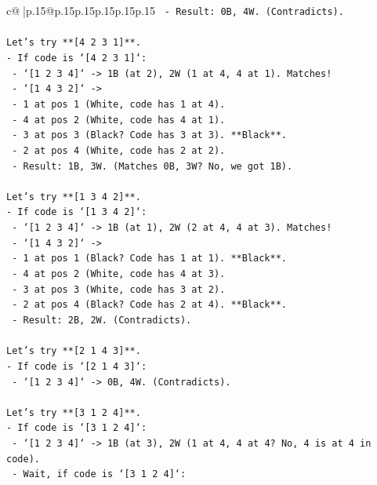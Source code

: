 \documentclass{article}
\begin{document}
{\begin{supertabular}{c@{$\;$}|p{.15\linewidth}@{}p{.15\linewidth}p{.15\linewidth}p{.15\linewidth}p{.15\linewidth}p{.15\linewidth}}
{{{\texttt{    {-} Result: 0B, 4W. (Contradicts).} \\
\\ 
\texttt{Let's try **{[}4 2 3 1{]}**.} \\
\texttt{{-} If code is `{[}4 2 3 1{]}`:} \\
\texttt{  {-} `{[}1 2 3 4{]}` {-}> 1B (at 2), 2W (1 at 4, 4 at 1). Matches!} \\
\texttt{  {-} `{[}1 4 3 2{]}` {-}>} \\
\texttt{    {-} 1 at pos 1 (White, code has 1 at 4).} \\
\texttt{    {-} 4 at pos 2 (White, code has 4 at 1).} \\
\texttt{    {-} 3 at pos 3 (Black? Code has 3 at 3). **Black**.} \\
\texttt{    {-} 2 at pos 4 (White, code has 2 at 2).} \\
\texttt{    {-} Result: 1B, 3W. (Matches 0B, 3W? No, we got 1B).} \\
\\ 
\texttt{Let's try **{[}1 3 4 2{]}**.} \\
\texttt{{-} If code is `{[}1 3 4 2{]}`:} \\
\texttt{  {-} `{[}1 2 3 4{]}` {-}> 1B (at 1), 2W (2 at 4, 4 at 3). Matches!} \\
\texttt{  {-} `{[}1 4 3 2{]}` {-}>} \\
\texttt{    {-} 1 at pos 1 (Black? Code has 1 at 1). **Black**.} \\
\texttt{    {-} 4 at pos 2 (White, code has 4 at 3).} \\
\texttt{    {-} 3 at pos 3 (White, code has 3 at 2).} \\
\texttt{    {-} 2 at pos 4 (Black? Code has 2 at 4). **Black**.} \\
\texttt{    {-} Result: 2B, 2W. (Contradicts).} \\
\\ 
\texttt{Let's try **{[}2 1 4 3{]}**.} \\
\texttt{{-} If code is `{[}2 1 4 3{]}`:} \\
\texttt{  {-} `{[}1 2 3 4{]}` {-}> 0B, 4W. (Contradicts).} \\
\\ 
\texttt{Let's try **{[}3 1 2 4{]}**.} \\
\texttt{{-} If code is `{[}3 1 2 4{]}`:} \\
\texttt{  {-} `{[}1 2 3 4{]}` {-}> 1B (at 3), 2W (1 at 4, 4 at 4? No, 4 is at 4 in code).} \\
\texttt{  {-} Wait, if code is `{[}3 1 2 4{]}`:} \\
}}}
\end{supertabular}}
\end{document}
